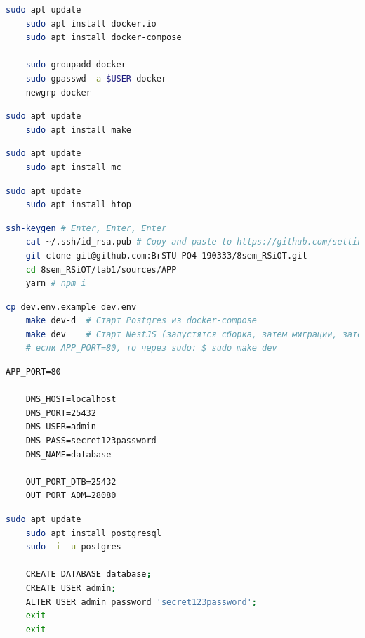 \documentclass[12pt, a4paper, simple]{eskdtext}
\begin{document}
  \begin{lstlisting}[language=bash,name=Установка Docker и docker-compose]
    sudo apt update
    sudo apt install docker.io
    sudo apt install docker-compose
    
    sudo groupadd docker
    sudo gpasswd -a $USER docker
    newgrp docker
  \end{lstlisting}

  \begin{lstlisting}[language=bash,name=Установка make (для Makefile)]
    sudo apt update
    sudo apt install make
  \end{lstlisting}

  \begin{lstlisting}[language=bash,name=Установка консольного файлового менеджера mc]
    sudo apt update
    sudo apt install mc
  \end{lstlisting}

  \begin{lstlisting}[language=bash,name=Установка консольного диспетчера задач htop]
    sudo apt update
    sudo apt install htop
  \end{lstlisting}

  \begin{lstlisting}[language=bash,name=Клонирования репозитория]
    ssh-keygen # Enter, Enter, Enter
    cat ~/.ssh/id_rsa.pub # Copy and paste to https://github.com/settings/ssh/new
    git clone git@github.com:BrSTU-PO4-190333/8sem_RSiOT.git
    cd 8sem_RSiOT/lab1/sources/APP
    yarn # npm i
  \end{lstlisting}

  \begin{lstlisting}[language=bash,name=Запуск режима dev]
    cp dev.env.example dev.env
    make dev-d  # Старт Postgres из docker-compose
    make dev    # Старт NestJS (запустятся сборка, затем миграции, затем приложение)
    # если APP_PORT=80, то через sudo: $ sudo make dev
  \end{lstlisting}

  \begin{lstlisting}[name=dev.env для c БД в docker-compose]
    APP_PORT=80

    DMS_HOST=localhost
    DMS_PORT=25432
    DMS_USER=admin
    DMS_PASS=secret123password
    DMS_NAME=database

    OUT_PORT_DTB=25432
    OUT_PORT_ADM=28080
  \end{lstlisting}

  \begin{lstlisting}[language=bash,name=Установка Postresql]
    sudo apt update
    sudo apt install postgresql
    sudo -i -u postgres
  
    CREATE DATABASE database;
    CREATE USER admin;
    ALTER USER admin password 'secret123password';
    exit
    exit
  \end{lstlisting}
\end{document}
